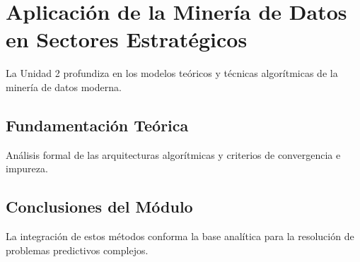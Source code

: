 \section{Aplicación de la Minería de Datos en Sectores Estratégicos}
\label{sec:u2_aplicacion_mineria_datos}
La Unidad 2 profundiza en los modelos teóricos y técnicas algorítmicas de la minería de datos moderna.
\subsection{Fundamentación Teórica}
Análisis formal de las arquitecturas algorítmicas y criterios de convergencia e impureza.

\subsection{Conclusiones del Módulo}
La integración de estos métodos conforma la base analítica para la resolución de problemas predictivos complejos.
